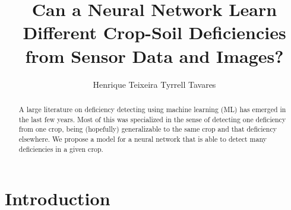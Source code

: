 \documentclass[]{article}
\title{Can a Neural Network Learn Different Crop-Soil Deficiencies from Sensor Data and Images?}
\author{Henrique Teixeira Tyrrell Tavares}
\theoremstyle{definition}
\theoremstyle{definition}
\begin{document}
\maketitle

\begin{abstract}
A large literature on deficiency detecting using machine learning (ML) has emerged in the last few years. Most of this was specialized in the sense of detecting one deficiency from one crop, being (hopefully) generalizable to the same crop and that deficiency elsewhere. We propose a model for a neural network that is able to detect many deficiencies in a given crop.
\end{abstract}

\section{Introduction}



\section{}

\section{}

\section{}

\section{}
\end{document}
